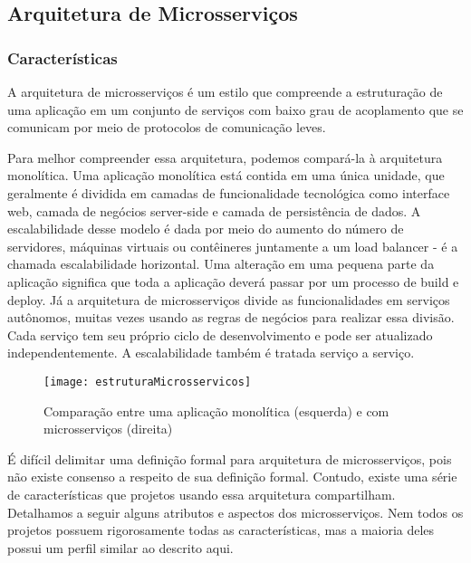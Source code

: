 \subsection{Arquitetura de Microsserviços}
\subsubsection{Características}
A arquitetura de microsserviços é um estilo que compreende a estruturação de uma aplicação em um conjunto de serviços com baixo grau de acoplamento que se comunicam por meio de protocolos de comunicação leves.

Para melhor compreender essa arquitetura, podemos compará-la à arquitetura monolítica. Uma aplicação monolítica está contida em uma única unidade, que geralmente é dividida em camadas de funcionalidade tecnológica como interface web, camada de negócios server-side e camada de persistência de dados. A escalabilidade desse modelo é dada por meio do aumento do número de servidores, máquinas virtuais ou contêineres juntamente a um load balancer - é a chamada escalabilidade horizontal. Uma alteração em uma pequena parte da aplicação significa que toda a aplicação deverá passar por um processo de build e deploy. Já a arquitetura de microsserviços divide as funcionalidades em serviços autônomos, muitas vezes usando as regras de negócios para realizar essa divisão. Cada serviço tem seu próprio ciclo de desenvolvimento e pode ser atualizado independentemente. A escalabilidade também é tratada serviço a serviço.

\begin{figure}[H]
	\centering
	\caption{Comparação entre uma aplicação monolítica (esquerda) e com microsserviços (direita)}
  \texttt{[image: estruturaMicrosservicos]}
\label{fig:estruturaMicrosservicos}
\end{figure}

É difícil delimitar uma definição formal para arquitetura de microsserviços, pois não existe consenso a respeito de sua definição formal. Contudo, existe uma série de características que projetos usando essa arquitetura compartilham. Detalhamos a seguir alguns atributos e aspectos dos microsserviços. Nem todos os projetos possuem rigorosamente todas as características, mas a maioria deles possui um perfil similar ao descrito aqui.


